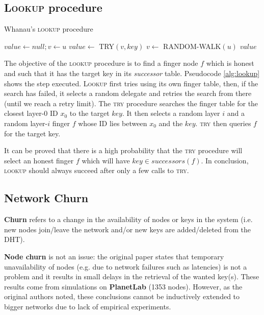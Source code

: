 \subsection{\textsc{Lookup} procedure}

\begin{algorithm} %
\caption{Whanau's \textsc{lookup} procedure} %
\label{alg:lookup} %
\begin{algorithmic}[1] %
    \STATE $value \gets null; v \gets u$
    \REPEAT
        \STATE $value \gets$ \textsc{TRY}$(v, key)$
        \STATE $v \gets$ \textsc{RANDOM-WALK}$(u)$
    \RETURN $value$
\end{algorithmic}
\end{algorithm}

The objective of the \textsc{lookup} procedure is to find a finger node $f$ which is honest and such that it has the target key in its \textit{successor} table. Pseudocode \ref{alg:lookup} shows the step executed. \textsc{Lookup} first tries using its own finger table, then, if the search has failed, it selects a random delegate and retries the search from there (until we reach a retry limit). The \textsc{try} procedure searches the finger table for the closest layer-0 ID $x_0$ to the target $key$. It then selects a random layer $i$ and a random layer-$i$ finger $f$ whose ID lies between $x_0$ and the $key$. \textsc{try} then queries $f$ for the target key.

It can be proved that there is a high probability that the \textsc{try} procedure will select an honest finger $f$ which will have $key \in successors(f)$. In conclusion, \textsc{lookup} should always succeed after only a few calls to \textsc{try}.  

\subsection{Network Churn}
\textbf{Churn} refers to a change in the availability of nodes or keys in the system (i.e. new nodes join/leave the network and/or new keys are added/deleted from the DHT).

\textbf{Node churn} is not an issue: the original paper states that temporary unavailability of nodes (e.g. due to network failures such as latencies) is not a problem and it results in small delays in the retrieval of the wanted key(s). These results come from simulations on \textbf{PlanetLab} (1353 nodes). However, as the original authors noted,  these conclusions cannot be inductively extended to bigger networks due to lack of empirical experiments.


